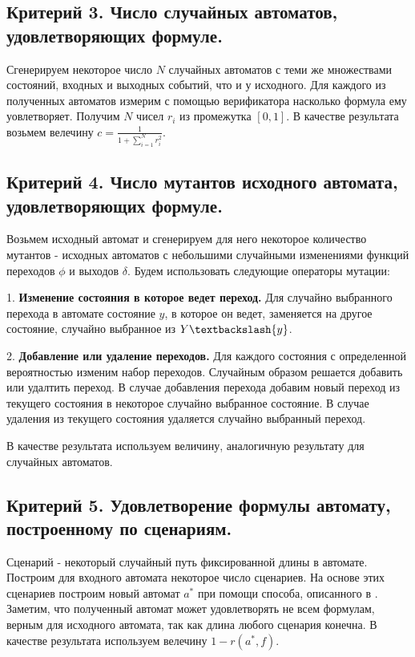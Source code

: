 \documentclass[12pt,fleqn]{article}
\begin{document}
\subsection*{Критерий 3. Число случайных автоматов, удовлетворяющих формуле.}

Сгенерируем некоторое число $N$ случайных автоматов с теми же множествами состояний, входных и выходных событий, что и
у исходного. Для каждого из полученных автоматов измерим с помощью верификатора насколько формула ему уовлетворяет.
Получим $N$ чисел $r_i$ из промежутка $[0, 1]$. В качестве результата возьмем велечину $c = \frac{1}{1 + \sum_{i = 1}^{N}r_i^2}$.

\subsection*{Критерий 4. Число мутантов исходного автомата, удовлетворяющих формуле.}

Возьмем исходный автомат и сгенерируем для него некоторое количество мутантов - исходных автоматов с небольшими
случайными изменениями функций переходов $\phi$ и выходов $\delta$. Будем использовать следующие операторы мутации:

1. \textbf{Изменение состояния в которое ведет переход.} Для случайно выбранного перехода в автомате состояние $y$,
в которое он ведет, заменяется на другое состояние, случайно выбранное из $Y\textbackslash \{y\}$. 

2. \textbf{Добавление или удаление переходов.} Для каждого состояния с определенной вероятностью изменим набор переходов.
Случайным образом решается добавить или удалтить переход. В случае добавления перехода добавим новый переход из
текущего состояния в некоторое случайно выбранное состояние. В случае удаления из текущего состояния удаляется
случайно выбранный переход.

В качестве результата используем величину, аналогичную результату для случайных автоматов.

\subsection*{Критерий 5. Удовлетворение формулы автомату, построенному по сценариям.}

Сценарий - некоторый случайный путь фиксированной длины в автомате. Построим для входного автомата некоторое
число сценариев. На основе этих сценариев построим новый автомат $a^*$ при помощи способа, описанного в \cite{eg}.
Заметим, что полученный автомат может удовлетворять не всем формулам, верным для исходного автомата, так как
длина любого сценария конечна. В качестве результата используем велечину $1 - r(a^*, f)$.
\end{document}
